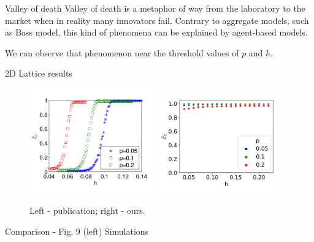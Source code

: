\documentclass[10pt]{beamer}
\begin{document}
\begin{frame}{Valley of death}
	Valley of death is a metaphor of way from the laboratory to the market when in reality many innovators fail. Contrary to aggregate models, such as Bass model, this kind of phenomena can be explained by agent-based models.
	
	We can observe that phenomenon near the threshold values of $p$ and $h$.
\end{frame}

\begin{frame}{2D Lattice results}
	\begin{figure}
		\includegraphics[width=0.475\textwidth]{../resources/images/fig9-left.png}
		\hfill
		\includegraphics[width=0.475\textwidth]{../results/images/hp-lattice.png}
		\caption{Left - publication; right - ours.}
	\end{figure}
	Comparison - Fig. 9 (left)
	Simulations
\end{frame}
\end{document}
